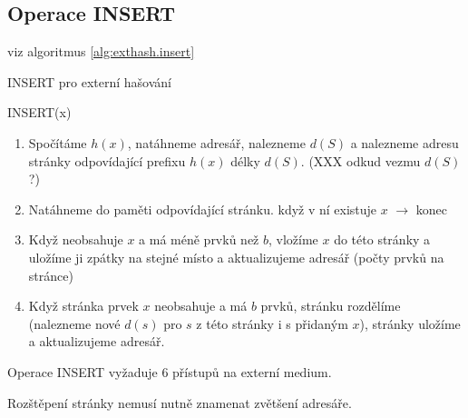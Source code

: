 \subsection{Operace INSERT}

viz algoritmus \ref{alg:exthash.insert}

\begin{algorithm}[!htb]
\caption{INSERT pro externí hašování}
\label{alg:exthash.insert}
INSERT(x)
\begin{enumerate}
\item Spočítáme $h(x)$, natáhneme adresář, nalezneme $d(S)$ a nalezneme adresu
stránky odpovídající prefixu $h(x)$ délky $d(S)$. (XXX odkud vezmu $d(S)$ ?)
\item Natáhneme do paměti odpovídající stránku. když v ní existuje $x$ 
$\rightarrow$ konec
\item Když neobsahuje $x$ a má méně prvků než $b$, vložíme $x$ do této stránky
a uložíme ji zpátky na stejné místo a aktualizujeme adresář (počty prvků
na stránce)
\item Když stránka prvek $x$ neobsahuje a má $b$ prvků, stránku rozdělíme
(nalezneme nové $d(s)$ pro $s$ z této stránky i s přidaným $x$), stránky 
uložíme a aktualizujeme adresář.
\end{enumerate}
\end{algorithm}

Operace INSERT vyžaduje 6 přístupů na externí medium.

\begin{pozn}
Rozštěpení stránky nemusí nutně znamenat zvětšení adresáře.
\end{pozn}

